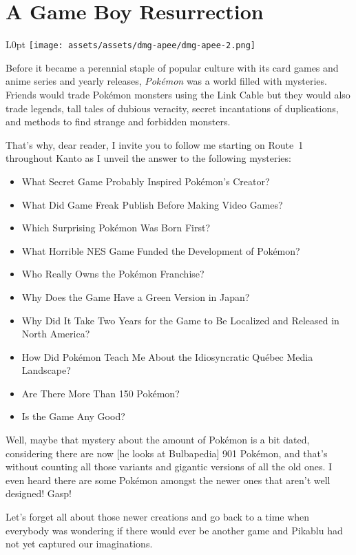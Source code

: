 \documentclass{book}
\begin{document}
\newpage\FloatBarrier\needspace{10mm}\section*{A Game Boy Resurrection}\nopagebreak[4]
\begin{wrapfigure}{L}{0pt} \texttt{[image: assets/assets/dmg-apee/dmg-apee-2.png]}\end{wrapfigure}
Before it became a perennial staple of popular culture with its card games and anime series and yearly releases, \emph{Pokémon} was a world filled with mysteries. Friends would trade Pokémon monsters using the Link Cable but they would also trade legends, tall tales of dubious veracity, secret incantations of duplications, and methods to find strange and forbidden monsters.

That’s why, dear reader, I invite you to follow me starting on Route 1 throughout Kanto as I unveil the answer to the following mysteries:

\begin{itemize} [nosep]
\item What Secret Game Probably Inspired Pokémon’s Creator?
\item What Did Game Freak Publish Before Making Video Games?
\item Which Surprising Pokémon Was Born First?
\item What Horrible NES Game Funded the Development of Pokémon?
\item Who Really Owns the Pokémon Franchise?
\item Why Does the Game Have a Green Version in Japan?
\item Why Did It Take Two Years for the Game to Be Localized and Released in North America?
\item How Did Pokémon Teach Me About the Idiosyncratic Québec Media Landscape?
\item Are There More Than 150 Pokémon?
\item Is the Game Any Good?
\end{itemize}\noindent

Well, maybe that mystery about the amount of Pokémon is a bit dated, considering there are now [he looks at Bulbapedia] 901 Pokémon, and that’s without counting all those variants and gigantic versions of all the old ones. I even heard there are some Pokémon amongst the newer ones that aren’t well designed! Gasp!

Let’s forget all about those newer creations and go back to a time when everybody was wondering if there would ever be another game and Pikablu had not yet captured our imaginations.
\end{document}
